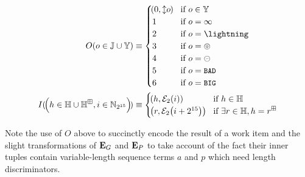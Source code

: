\begin{align}
  \encoderesult{o \in \workerror \cup \blob} &\equiv \begin{cases}
    \tup{0, \var{o}} &\when o \in \blob \\
    1 &\when o = \infty \\
    2 &\when o = \panic \\
    3 &\when o = \badexports \\
    4 &\when o = \oversize \\
    5 &\when o = \token{BAD} \\
    6 &\when o = \token{BIG}
    \\
  \end{cases}
  \\
  \encodeimportref{\tup{
    h \in \hash \cup \hash^\boxplus,
    i \in \Nbits{15}
  }} &\equiv \begin{cases}
    \tup{h, \fixedencode{2}{i}} &\when h \in \hash\\
    \tup{r, \fixedencode{2}{i + 2^{15}}} &\when \exists r \in \hash, h = r^\boxplus\\
  \end{cases}
\end{align}

Note the use of $O$ above to succinctly encode the result of a work item and the slight transformations of $\mathbf{E}_G$ and $\mathbf{E}_P$ to take account of the fact their inner tuples contain variable-length sequence terms $a$ and $p$ which need length discriminators.
